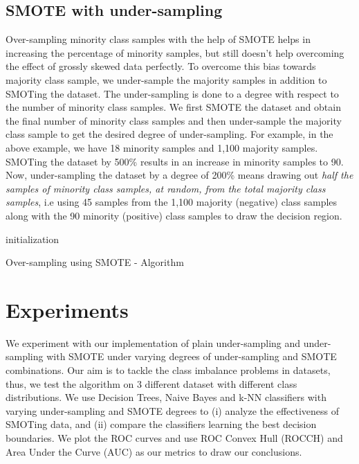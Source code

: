 \documentclass[10pt,journal,compsoc]{IEEEtran}
\begin{document}
\subsection{SMOTE with under-sampling}
\label{subsec:smoteu}
Over-sampling minority class samples with the help of SMOTE helps in increasing the percentage of minority samples, but still doesn't help overcoming the effect of grossly skewed data perfectly.
To overcome this bias towards majority class sample, we under-sample the majority samples in addition to SMOTing the dataset.
The under-sampling is done to a degree with respect to the number of minority class samples.
We first SMOTE the dataset and obtain the final number of minority class samples and then under-sample the majority class sample to get the desired degree of under-sampling.
For example, in the above example, we have 18 minority samples and 1,100 majority samples. 
SMOTing the dataset by 500\% results in an increase in minority samples to 90.
Now, under-sampling the dataset by a degree of 200\% means drawing out \textit{half the samples of minority class samples, at random, from the total majority class samples}, i.e using 45 samples from the 1,100 majority (negative) class samples along with the 90 minority (positive) class samples to draw the decision region.

\begin{algorithm}[!h]
 initialization\;
 \caption{Over-sampling using SMOTE - Algorithm}
 \label{algo:smote}
\end{algorithm}

\section{Experiments}
We experiment with our implementation of plain under-sampling and under-sampling with SMOTE under varying degrees of under-sampling and SMOTE combinations.   
Our aim is to tackle the class imbalance problems in datasets, thus, we test the algorithm on 3 different dataset with different class distributions.
We use Decision Trees, Naive Bayes and k-NN classifiers with varying under-sampling and SMOTE degrees to (i) analyze the effectiveness of SMOTing data, and (ii) compare the classifiers learning the best decision boundaries.
We plot the ROC curves and use ROC Convex Hull (ROCCH) and Area Under the Curve (AUC) as our metrics to draw our conclusions.
\end{document}
